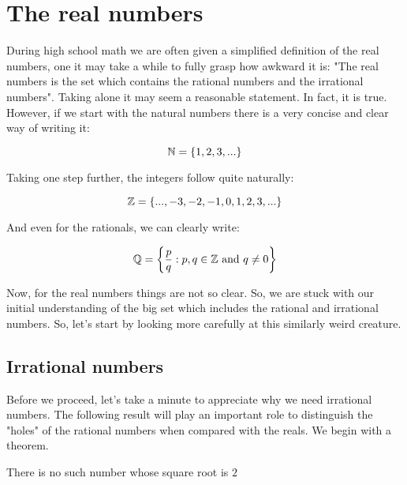 \chapter{The real numbers}

During high school math we are often given a simplified definition of the real numbers, one it may take a while to fully grasp how awkward it is: "The real numbers is the set which contains the rational numbers and the irrational numbers". Taking alone it may seem a reasonable statement. In fact, it is true. However, if we start with the natural numbers there is a very concise and clear way of writing it:

\begin{equation}
    \mathbb{N} = \{1, 2, 3, ...\}
\end{equation}

Taking one step further, the integers follow quite naturally:

\begin{equation}
    \mathbb{Z} = \{..., -3, -2, -1, 0, 1, 2, 3, ... \}
\end{equation}

And even for the rationals, we can clearly write:

\begin{equation}
    \mathbb{Q} = \left \{
        \frac{p}{q}: p, q \in \mathbb{Z} \text{ and } q \neq 0
    \right \}
\end{equation}

Now, for the real numbers things are not so clear. So, we are stuck with our initial understanding of the big set which includes the rational and irrational numbers. So, let's start by looking more carefully at this similarly weird creature.

\section{Irrational numbers}

Before we proceed, let's take a minute to appreciate why we need irrational numbers. The following result will play an important role to distinguish the "holes" of the rational numbers when compared with the reals. We begin with a theorem.

\begin{theorem}
    There is no such number whose square root is $2$
\end{theorem}

